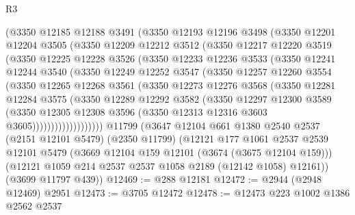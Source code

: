 \begin{lexlean}{R3}
\begin{coremodule}
        (@3350
          @12185
          @12188
          @3491
          (@3350
            @12193
            @12196
            @3498
            (@3350
              @12201
              @12204
              @3505
              (@3350
                @12209
                @12212
                @3512
                (@3350
                  @12217
                  @12220
                  @3519
                  (@3350
                    @12225
                    @12228
                    @3526
                    (@3350
                      @12233
                      @12236
                      @3533
                      (@3350
                        @12241
                        @12244
                        @3540
                        (@3350
                          @12249
                          @12252
                          @3547
                          (@3350
                            @12257
                            @12260
                            @3554
                            (@3350
                              @12265
                              @12268
                              @3561
                              (@3350
                                @12273
                                @12276
                                @3568
                                (@3350
                                  @12281
                                  @12284
                                  @3575
                                  (@3350
                                    @12289
                                    @12292
                                    @3582
                                    (@3350
                                      @12297
                                      @12300
                                      @3589
                                      (@3350
                                        @12305
                                        @12308
                                        @3596
                                        (@3350 @12313 @12316 @3603 @3605)))))))))))))))))))
    @11799
    (@3647
      @12104
      @661
      @1380
      @2540
      @2537
      (@2151 @12101 @5479)
      (@2350 @11799)
      (@12121
        @177
        @1061
        @2537
        @2539
        @12101
        @5479
        (@3669 @12104 @159 @12101 (@3674 (@3675 @12104 @159)))
        (@12121 @1059 @214 @2537 @2537 @1058 @2189 (@12142 @1058) @12161))
      (@3699 @11797 @439))
@12469 := @288 @12181
@12472 := @2944 (@2948 @12469) @2951
@12473 := @3705 @12472
@12478 := @12473 @223 @1002 @1386 @2562 @2537

\end{coremodule}
\end{lexlean}
